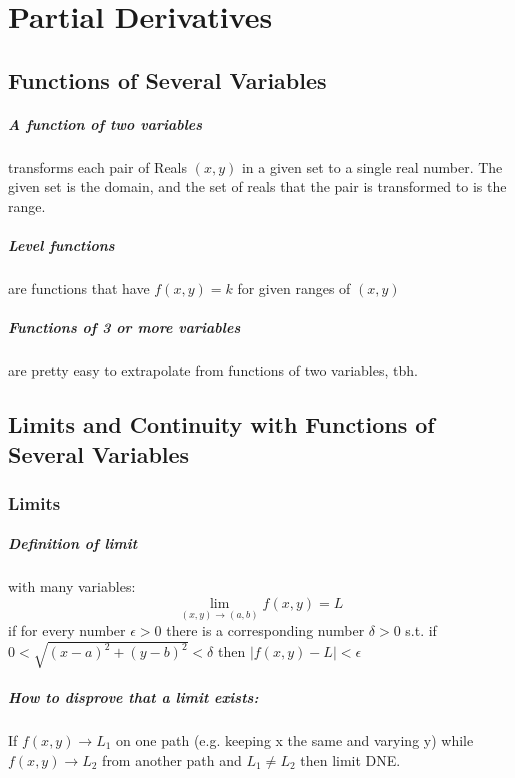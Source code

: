 \documentclass[a4paper,12pt]{report}
\begin{document}
\chapter{Partial Derivatives}
\section{Functions of Several Variables}
\paragraph{A function of two variables } transforms each pair of Reals $(x, y)$ in a given set to a single real number. The given set is the domain, and the set of reals that the pair is transformed to is the range.

\paragraph{Level functions } are functions that have $f(x, y) = k$ for given ranges of $(x, y)$

\paragraph{Functions of 3 or more variables } are pretty easy to extrapolate from functions of two variables, tbh.

\section{Limits and Continuity with Functions of Several Variables}
\subsection{Limits}
\paragraph{Definition of limit } with many variables:
$$\lim_{(x, y) \to (a, b)} f(x, y) = L$$
if for every number $\epsilon > 0$ there is a corresponding number $\delta > 0$ s.t.
if $0 < \sqrt{(x-a)^2 + (y-b)^2} < \delta$ then $|f(x, y) - L | < \epsilon$

\paragraph{How to disprove that a limit exists: }

If $f(x, y) \to L_1$ on one path (e.g. keeping x the same and varying y) while $f(x, y) \to L_2$ from another path and $L_1 \neq L_2$ then limit DNE.
\end{document}
